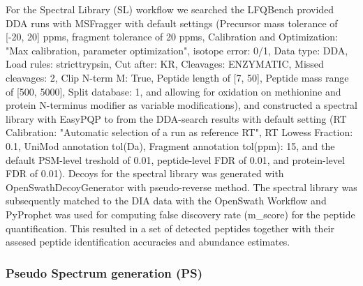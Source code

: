 \documentclass[10pt,letterpaper]{article}
\begin{document}
For the Spectral Library (SL) workflow we searched the LFQBench provided DDA runs with MSFragger\cite{kong2017msfragger} with default settings (Precursor mass tolerance of [-20, 20] ppms, fragment tolerance of 20 ppms, Calibration and Optimization: "Max calibration, parameter optimization", isotope error: 0/1, Data type: DDA, Load rules: stricttrypsin, Cut after: KR, Cleavages: ENZYMATIC, Missed cleavages: 2, Clip N-term M: True, Peptide length of [7, 50], Peptide mass range of [500, 5000], Split database: 1, and allowing for oxidation on methionine and protein N-terminus modifier as variable modifications), and constructed a spectral library with EasyPQP \cite{easypqp} to from the DDA-search results with default setting (RT Calibration: "Automatic selection of a run as reference RT", RT Lowess Fraction: 0.1, UniMod annotation tol(Da), Fragment annotation tol(ppm): 15, and the default PSM-level treshold of 0.01, peptide-level FDR of 0.01, and protein-level FDR of 0.01). Decoys for the spectral library was generated with OpenSwathDecoyGenerator with pseudo-reverse method. The spectral library was subsequently matched to the DIA data with the OpenSwath Workflow and  PyProphet\cite{teleman2015diana} was used for computing false discovery rate (m\_score) for the peptide quantification. This resulted in a set of detected peptides together with their assesed peptide identification accuracies and abundance estimates.



\subsubsection*{Pseudo Spectrum generation (PS)}
\end{document}
